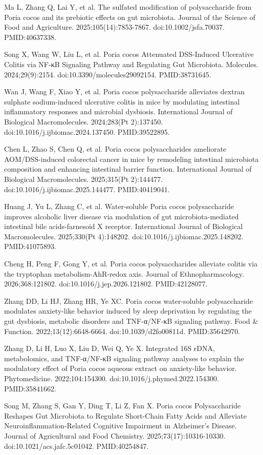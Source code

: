 \documentclass[11pt,oneside]{book}
\newcommand{\reff}[2]{\par\hangindent=7mm\hangafter=1\noindent[#1]\hspace{2mm}#2\par}
\begin{document}
\reff{20}{Ma L, Zhang Q, Lai Y, et al. The sulfated modification of polysaccharide from Poria cocos and its prebiotic effects on gut microbiota. Journal of the Science of Food and Agriculture. 2025;105(14):7853-7867. doi:10.1002/jsfa.70037. PMID:40637338.}
\reff{21}{Song X, Wang W, Liu L, et al. Poria cocos Attenuated DSS-Induced Ulcerative Colitis via NF-κB Signaling Pathway and Regulating Gut Microbiota. Molecules. 2024;29(9):2154. doi:10.3390/molecules29092154. PMID:38731645.}
\reff{22}{Wan J, Wang F, Xiao Y, et al. Poria cocos polysaccharide alleviates dextran sulphate sodium-induced ulcerative colitis in mice by modulating intestinal inflammatory responses and microbial dysbiosis. International Journal of Biological Macromolecules. 2024;283(Pt 2):137450. doi:10.1016/j.ijbiomac.2024.137450. PMID:39522895.}
\reff{23}{Chen L, Zhao S, Chen Q, et al. Poria cocos polysaccharides ameliorate AOM/DSS-induced colorectal cancer in mice by remodeling intestinal microbiota composition and enhancing intestinal barrier function. International Journal of Biological Macromolecules. 2025;315(Pt 2):144477. doi:10.1016/j.ijbiomac.2025.144477. PMID:40419041.}
\reff{24}{Huang J, Yu L, Zhang C, et al. Water-soluble Poria cocos polysaccharide improves alcoholic liver disease via modulation of gut microbiota-mediated intestinal bile acids-farnesoid X receptor. International Journal of Biological Macromolecules. 2025;330(Pt 4):148202. doi:10.1016/j.ijbiomac.2025.148202. PMID:41075893.}
\reff{25}{Cheng H, Peng F, Gong Y, et al. Poria cocos polysaccharides alleviate colitis via the tryptophan metabolism-AhR-redox axis. Journal of Ethnopharmacology. 2026;368:121802. doi:10.1016/j.jep.2026.121802. PMID:42128077.}
\reff{26}{Zhang DD, Li HJ, Zhang HR, Ye XC. Poria cocos water-soluble polysaccharide modulates anxiety-like behavior induced by sleep deprivation by regulating the gut dysbiosis, metabolic disorders and TNF-α/NF-κB signaling pathway. Food \& Function. 2022;13(12):6648-6664. doi:10.1039/d2fo00811d. PMID:35642970.}
\reff{27}{Zhang D, Li H, Luo X, Liu D, Wei Q, Ye X. Integrated 16S rDNA, metabolomics, and TNF-α/NF-κB signaling pathway analyses to explain the modulatory effect of Poria cocos aqueous extract on anxiety-like behavior. Phytomedicine. 2022;104:154300. doi:10.1016/j.phymed.2022.154300. PMID:35841662.}
\reff{28}{Song M, Zhang S, Gan Y, Ding T, Li Z, Fan X. Poria cocos Polysaccharide Reshapes Gut Microbiota to Regulate Short-Chain Fatty Acids and Alleviate Neuroinflammation-Related Cognitive Impairment in Alzheimer's Disease. Journal of Agricultural and Food Chemistry. 2025;73(17):10316-10330. doi:10.1021/acs.jafc.5c01042. PMID:40254847.}
\end{document}
